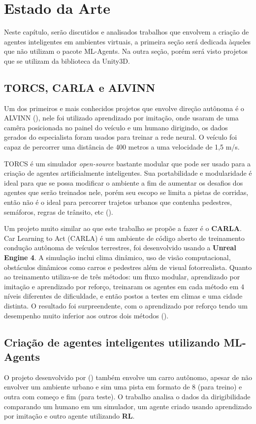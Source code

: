 \chapter{Estado da Arte}\label{cap:estArte}
Neste capítulo, serão discutidos e analisados trabalhos que envolvem a criação de agentes inteligentes em ambientes virtuais, a primeira seção será dedicada àqueles que não utilizam o pacote ML-Agents. Na outra seção, porém será visto projetos que se utilizam da biblioteca da Unity3D.

\section*{TORCS, CARLA e ALVINN}
Um dos primeiros e mais conhecidos projetos que envolve direção autônoma é o ALVINN (), nele foi utilizado aprendizado por imitação, onde usaram de uma camêra posicionada no painel do veículo e um humano dirigindo, os dados gerados do especialista foram usados para treinar a rede neural. O veículo foi capaz de percorrer uma distância de 400 metros a uma velocidade de 1,5 m/s. 

TORCS é um simulador \textit{open-source} bastante modular que pode ser usado para a criação de agentes artificialmente inteligentes. Sua portabilidade e modularidade é ideal para que se possa modificar o ambiente a fim de aumentar os desafios dos agentes que serão treinados nele, porém seu escopo se limita a pistas de corridas, então não é o ideal para percorrer trajetos urbanos que contenha pedestres, semáforos, regras de trânsito, etc ().

Um projeto muito similar ao que este trabalho se propõe a fazer é o \textbf{CARLA}. Car Learning to Act (CARLA) é um ambiente de código aberto de treinamento condução autônoma de veículos terrestres, foi desenvolvido usando a \textbf{Unreal Engine 4}. A simulação inclui clima dinâmico, uso de visão computacional, obstáculos dinâmicos como carros e pedestres além de visual fotorrealista. Quanto ao treinamento utiliza-se de três métodos: um fluxo modular, aprendizado por imitação e aprendizado por reforço, treinaram os agentes em cada método em 4 níveis diferentes de dificuldade, e então postos a testes em climas e uma cidade distinta. O resultado foi surpreendente, com o aprendizado por reforço tendo um desempenho muito inferior aos outros dois métodos ().

\section*{Criação de agentes inteligentes utilizando ML-Agents}\label{sec:primTrab}
O projeto desenvolvido por () também envolve um carro autônomo, apesar de não envolver um ambiente urbano e sim uma pista em formato de 8 (para treino) e outra com começo e fim (para teste). O trabalho analisa o dados da dirigibilidade comparando um humano em um simulador, um agente criado usando aprendizado por imitação e outro agente utilizando \textbf{RL}. 

